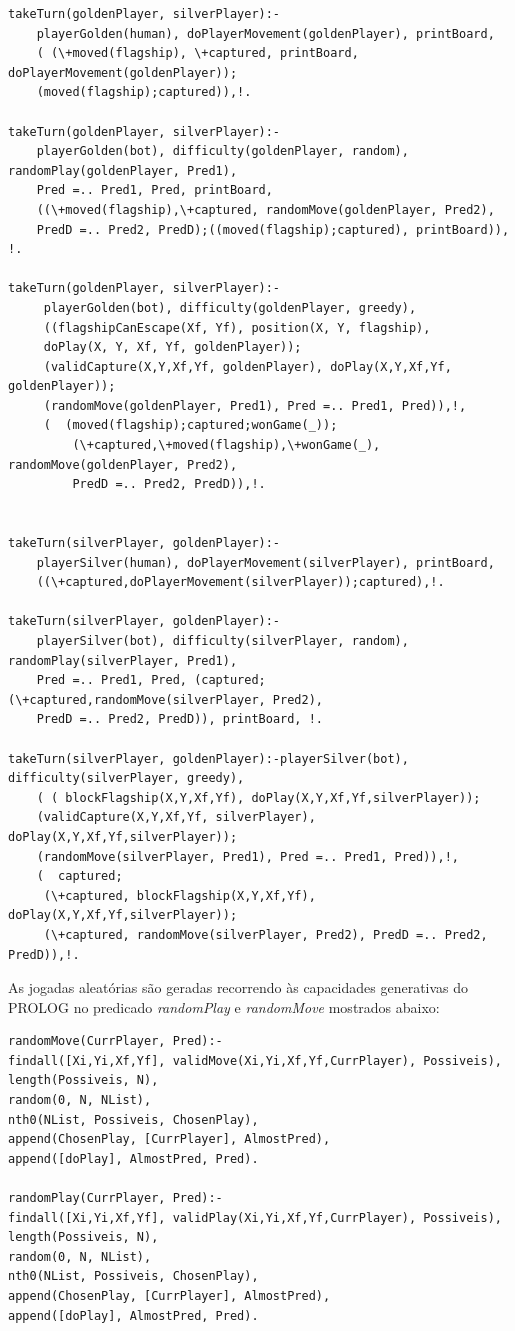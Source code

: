 \documentclass[a4paper]{article}
\begin{document}
\begin{verbatim}
takeTurn(goldenPlayer, silverPlayer):-
    playerGolden(human), doPlayerMovement(goldenPlayer), printBoard,
    ( (\+moved(flagship), \+captured, printBoard, doPlayerMovement(goldenPlayer));
    (moved(flagship);captured)),!.

takeTurn(goldenPlayer, silverPlayer):-
    playerGolden(bot), difficulty(goldenPlayer, random), randomPlay(goldenPlayer, Pred1),
    Pred =.. Pred1, Pred, printBoard,
    ((\+moved(flagship),\+captured, randomMove(goldenPlayer, Pred2),
    PredD =.. Pred2, PredD);((moved(flagship);captured), printBoard)), !.

takeTurn(goldenPlayer, silverPlayer):-
	 playerGolden(bot), difficulty(goldenPlayer, greedy),
	 ((flagshipCanEscape(Xf, Yf), position(X, Y, flagship),
	 doPlay(X, Y, Xf, Yf, goldenPlayer));
	 (validCapture(X,Y,Xf,Yf, goldenPlayer), doPlay(X,Y,Xf,Yf, goldenPlayer));
	 (randomMove(goldenPlayer, Pred1), Pred =.. Pred1, Pred)),!,
	 (  (moved(flagship);captured;wonGame(_));
	 	 (\+captured,\+moved(flagship),\+wonGame(_), randomMove(goldenPlayer, Pred2),
	 	 PredD =.. Pred2, PredD)),!.


takeTurn(silverPlayer, goldenPlayer):-
    playerSilver(human), doPlayerMovement(silverPlayer), printBoard,
    ((\+captured,doPlayerMovement(silverPlayer));captured),!.

takeTurn(silverPlayer, goldenPlayer):-
    playerSilver(bot), difficulty(silverPlayer, random), randomPlay(silverPlayer, Pred1),
    Pred =.. Pred1, Pred, (captured;(\+captured,randomMove(silverPlayer, Pred2),
    PredD =.. Pred2, PredD)), printBoard, !.

takeTurn(silverPlayer, goldenPlayer):-playerSilver(bot), difficulty(silverPlayer, greedy),
    ( ( blockFlagship(X,Y,Xf,Yf), doPlay(X,Y,Xf,Yf,silverPlayer));
	(validCapture(X,Y,Xf,Yf, silverPlayer), doPlay(X,Y,Xf,Yf,silverPlayer));
	(randomMove(silverPlayer, Pred1), Pred =.. Pred1, Pred)),!,
    (  captured;
	 (\+captured, blockFlagship(X,Y,Xf,Yf), doPlay(X,Y,Xf,Yf,silverPlayer));
	 (\+captured, randomMove(silverPlayer, Pred2), PredD =.. Pred2, PredD)),!.
\end{verbatim}

As jogadas aleatórias são geradas recorrendo às capacidades generativas do PROLOG no predicado \textit{randomPlay} e \textit{randomMove} mostrados abaixo:

\begin{verbatim}
randomMove(CurrPlayer, Pred):-
findall([Xi,Yi,Xf,Yf], validMove(Xi,Yi,Xf,Yf,CurrPlayer), Possiveis),
length(Possiveis, N),
random(0, N, NList),
nth0(NList, Possiveis, ChosenPlay),
append(ChosenPlay, [CurrPlayer], AlmostPred),
append([doPlay], AlmostPred, Pred).

randomPlay(CurrPlayer, Pred):-
findall([Xi,Yi,Xf,Yf], validPlay(Xi,Yi,Xf,Yf,CurrPlayer), Possiveis),
length(Possiveis, N),
random(0, N, NList),
nth0(NList, Possiveis, ChosenPlay),
append(ChosenPlay, [CurrPlayer], AlmostPred),
append([doPlay], AlmostPred, Pred).
\end{verbatim}
\end{document}
